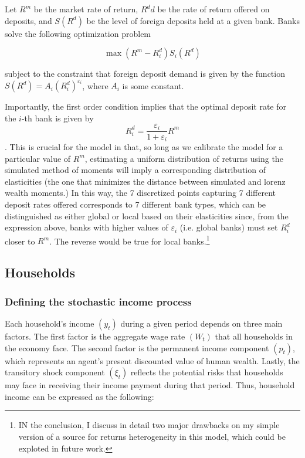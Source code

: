 \par Let $R^m$ be the market rate of return, $R^dd$ be the rate of return offered on deposits, and $S(R^d)$ be the level of foreign deposits held at a given bank. Banks solve the following optimization problem

$$ \max (R^m -R_i^d) S_i(R^d) $$

\par subject to the constraint that foreign deposit demand is given by the function $S(R^d) = A_i (R_i^d)^{\varepsilon_i}$, where $A_i$ is some constant. 

\par Importantly, the first order condition implies that the optimal deposit rate for the $i$-th bank is given by $$ R_i^d = \frac{\varepsilon_i}{1+\varepsilon_i} R^m  $$. This is crucial for the model in that, so long as we calibrate the model for a particular value of $R^m$, estimating a uniform distribution of returns using the simulated method of moments will imply a corresponding distribution of elasticities (the one that minimizes the distance between simulated and lorenz wealth moments.) In this way, the 7 discretized points capturing 7 different deposit rates offered corresponds to 7 different bank types, which can be distinguished as either global or local based on their elasticities since, from the expression above, banks with higher values of $\varepsilon_i$ (i.e. global banks)  must set $R_i^d$ closer to $R^m$. The reverse would be true for local banks.\footnote{IN the conclusion, I discuss in detail two major drawbacks on my simple version of a source for returns heterogeneity in this model, which could be exploted in future work.}

\subsection{Households}

\subsubsection{Defining the stochastic income process}

\par Each household's income $(y_t)$ during a given period depends on three main factors. The first factor is the aggregate wage rate $(W_t)$ that all households in the economy face. The second factor is the permanent income component $(p_t)$, which represents an agent's present discounted value of human wealth. Lastly, the transitory shock component $(\xi_t)$ reflects the potential risks that households may face in receiving their income payment during that period. Thus, household income can be expressed as the following:

